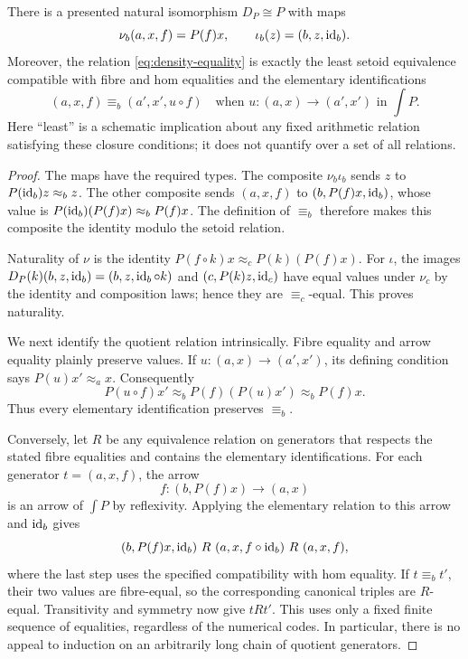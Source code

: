 \begin{theorem}
\label{thm:co-yoneda-normal}
There is a presented natural isomorphism $D_P\cong P$ with maps
\[
 \nu_b(a,x,f)=P(f)x,\qquad
 \iota_b(z)=(b,z,\operatorname{id}_b).
\]
Moreover, the relation \eqref{eq:density-equality} is exactly the least
setoid equivalence compatible with fibre and hom equalities and the elementary
identifications
\begin{equation}
 (a,x,f)\equiv_b(a',x',u\circ f)
 \quad\text{when }u:(a,x)\to(a',x')\text{ in }\int P.
 \label{eq:density-elementary}
\end{equation}
Here ``least'' is a schematic implication about any fixed arithmetic
relation satisfying these closure conditions; it does not quantify over a
set of all relations.
\end{theorem}
\begin{proof}
The maps have the required types.  The composite $\nu_b\iota_b$ sends $z$
to $P(\operatorname{id}_b)z\approx_b z$.  The other composite sends $(a,x,f)$ to
$(b,P(f)x,\operatorname{id}_b)$, whose value is
$P(\operatorname{id}_b)(P(f)x)\approx_b P(f)x$.  The definition of $\equiv_b$ therefore
makes this composite the identity modulo the setoid relation.

Naturality of $\nu$ is the identity
$P(f\circ k)x\approx_c P(k)(P(f)x)$.  For $\iota$, the images
$D_P(k)(b,z,\operatorname{id}_b)=(b,z,\operatorname{id}_b\circ k)$ and
$(c,P(k)z,\operatorname{id}_c)$ have equal values under $\nu_c$ by the identity and
composition laws; hence they are $\equiv_c$-equal.  This proves naturality.

We next identify the quotient relation intrinsically.  Fibre equality and
arrow equality plainly preserve values.  If $u:(a,x)\to(a',x')$, its
defining condition says $P(u)x'\approx_a x$.  Consequently
\[
 P(u\circ f)x'\approx_b P(f)(P(u)x')\approx_b P(f)x.
\]
Thus every elementary identification preserves $\equiv_b$.

Conversely, let $R$ be any equivalence relation on generators that respects
the stated fibre equalities and contains the elementary identifications.
For each generator $t=(a,x,f)$, the arrow
\[
 f:(b,P(f)x)\longrightarrow(a,x)
\]
is an arrow of $\int P$ by reflexivity.  Applying the elementary relation
to this arrow and $\operatorname{id}_b$ gives
\[
 (b,P(f)x,\id_b)\ R\ (a,x,f\circ\id_b)\ R\ (a,x,f),
\]
where the last step uses the specified compatibility with hom equality.
If $t\equiv_b t'$, their two values are fibre-equal, so the corresponding
canonical triples are $R$-equal.  Transitivity and symmetry now give $t R t'$.
This uses only a fixed finite sequence of equalities, regardless of the
numerical codes.  In particular, there is no appeal to induction on an
arbitrarily long chain of quotient generators.
\end{proof}


